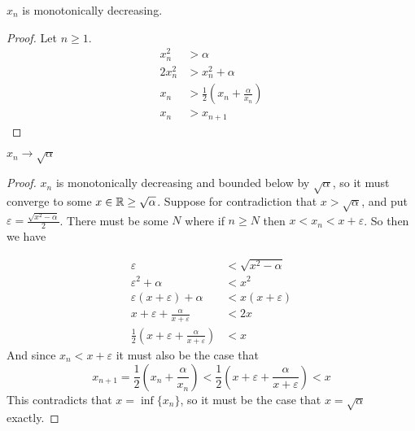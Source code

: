 \documentclass{article}
\begin{document}
\begin{enumerate}
\begin{enumerate}[a.]
\claim $x_n$ is monotonically decreasing.
\begin{proof}
Let $n \geq 1$.
\begin{equation*}
\begin{split}
 x_n^2 &> \alpha \\
2x_n^2 &> x_n^2 + \alpha \\
   x_n &> \frac{1}{2} \left(x_n + \frac{\alpha}{x_n}\right) \\
   x_n &> x_{n+1}
\end{split}
\end{equation*}
\end{proof}

\claim $x_n \to \sqrt{\alpha}$
\begin{proof}
$x_n$ is monotonically decreasing and bounded below by $\sqrt{\alpha}$, so it
must converge to some $x \in \mathbb{R} \geq \sqrt{\alpha}$. Suppose for contradiction
that $x > \sqrt{\alpha}$, and put $\varepsilon = \frac{\sqrt{x^2 - \alpha}}{2}$.
There must be some $N$ where if $n\geq N$ then $x < x_n < x+\varepsilon$. So
then we have

\begin{equation*}
\begin{split}
\varepsilon &< \sqrt{x^2 - \alpha} \\
\varepsilon^2 + \alpha &< x^2 \\
\varepsilon(x + \varepsilon) + \alpha &< x(x+\varepsilon) \\
x + \varepsilon + \frac{\alpha}{x+\varepsilon} &< 2x \\
\frac{1}{2}\left(x + \varepsilon + \frac{\alpha}{x+\varepsilon}\right) &< x
\end{split}
\end{equation*}
And since $x_n < x + \varepsilon$ it must also be the case that
\begin{equation*}
x_{n+1} = \frac{1}{2}\left(x_n + \frac{\alpha}{x_n}\right)
        < \frac{1}{2}\left(x+\varepsilon + \frac{\alpha}{x+\varepsilon}\right)
        < x
\end{equation*}
This contradicts that $x = \inf\{x_n\}$, so it must be the case that
$x = \sqrt{\alpha}$ exactly.
\end{proof}
\end{enumerate}
\end{enumerate}
\end{document}
